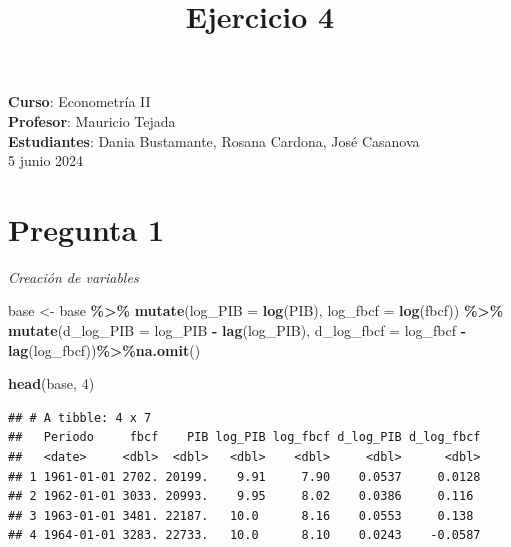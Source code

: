 \documentclass[
  12pt,
]{article}
\title{\textbf{Ejercicio 4}}
\author{}
\date{\vspace{-2.5em}}
\newenvironment{Shaded}{\begin{snugshade}}{\end{snugshade}}
\newcommand{\AttributeTok}[1]{\textcolor[rgb]{0.13,0.29,0.53}{#1}}
\newcommand{\DecValTok}[1]{\textcolor[rgb]{0.00,0.00,0.81}{#1}}
\newcommand{\FunctionTok}[1]{\textcolor[rgb]{0.13,0.29,0.53}{\textbf{#1}}}
\newcommand{\NormalTok}[1]{#1}
\newcommand{\OtherTok}[1]{\textcolor[rgb]{0.56,0.35,0.01}{#1}}
\newcommand{\SpecialCharTok}[1]{\textcolor[rgb]{0.81,0.36,0.00}{\textbf{#1}}}
\begin{document}
\maketitle

\maketitle
\vspace{-5em}
\vspace{0.5em}

\begin{center}
\footnotesize \textbf{Curso}: Econometría II \\
\footnotesize \textbf{Profesor}: Mauricio Tejada \\
\footnotesize \textbf{Estudiantes}: Dania Bustamante, Rosana Cardona, José Casanova \\
\footnotesize 5 junio 2024 \\
\end{center}

\section{Pregunta 1}\label{pregunta-1}

\emph{Creación de variables}

\begin{Shaded}
\begin{Highlighting}[]
\NormalTok{base }\OtherTok{\textless{}{-}}\NormalTok{ base }\SpecialCharTok{\%\textgreater{}\%}
  \FunctionTok{mutate}\NormalTok{(}\AttributeTok{log\_PIB =} \FunctionTok{log}\NormalTok{(PIB), }\AttributeTok{log\_fbcf =} \FunctionTok{log}\NormalTok{(fbcf)) }\SpecialCharTok{\%\textgreater{}\%}
  \FunctionTok{mutate}\NormalTok{(}\AttributeTok{d\_log\_PIB =}\NormalTok{ log\_PIB }\SpecialCharTok{{-}} \FunctionTok{lag}\NormalTok{(log\_PIB), }
         \AttributeTok{d\_log\_fbcf =}\NormalTok{ log\_fbcf }\SpecialCharTok{{-}} \FunctionTok{lag}\NormalTok{(log\_fbcf))}\SpecialCharTok{\%\textgreater{}\%}\FunctionTok{na.omit}\NormalTok{()}

\FunctionTok{head}\NormalTok{(base, }\DecValTok{4}\NormalTok{)}
\end{Highlighting}
\end{Shaded}

\begin{verbatim}
## # A tibble: 4 x 7
##   Periodo     fbcf    PIB log_PIB log_fbcf d_log_PIB d_log_fbcf
##   <date>     <dbl>  <dbl>   <dbl>    <dbl>     <dbl>      <dbl>
## 1 1961-01-01 2702. 20199.    9.91     7.90    0.0537     0.0128
## 2 1962-01-01 3033. 20993.    9.95     8.02    0.0386     0.116 
## 3 1963-01-01 3481. 22187.   10.0      8.16    0.0553     0.138 
## 4 1964-01-01 3283. 22733.   10.0      8.10    0.0243    -0.0587
\end{verbatim}
\end{document}
